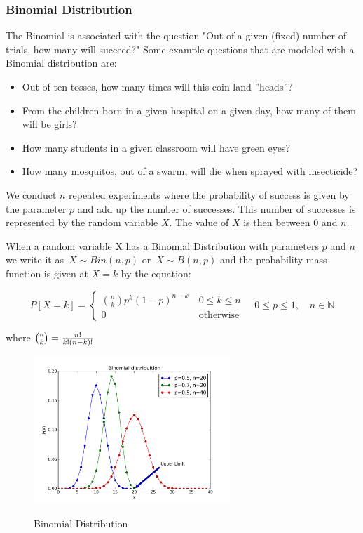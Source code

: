 \subsubsection{Binomial Distribution}
The Binomial is associated with the question "Out of a given (fixed) number of trials, how many will succeed?" Some example questions that are modeled with a Binomial distribution are:
\begin{itemize}
  \item Out of ten tosses, how many times will this coin land ''heads''?
  \item From the children born in a given hospital on a given day, how many of them will be girls?
  \item How many students in a given classroom will have green eyes?
  \item How many mosquitos, out of a swarm, will die when sprayed with insecticide?
\end{itemize}

  We conduct $n$ repeated experiments where the probability of success is given by the parameter $p$ and add up the number of successes. This number of successes is represented by the random variable $X$.  The value of $X$ is then between 0 and $n$.

When a random variable X has a Binomial Distribution with parameters $p$ and $n$ we write it as $\,X \sim Bin(n,p)$ or $\,X \sim B(n,p)$ and the probability mass function is given at $X=k$ by the equation:

\begin{equation}
    P\left[X = k\right] = \begin{cases} {n \choose k} p^k \left(1-p\right)^{n-k}\ & 0 \le k \le n \\ 0 & \mbox{otherwise} \end{cases} \quad 0 \leq p \leq 1, \quad n \in \mathbb{N}
\end{equation}

where ${n \choose k}={n! \over k!(n-k)!}$

\begin{figure}
  \centering
  \includegraphics[width=0.66\textwidth]{../Images/Binomial_distribution_pmf.png}\\
  \caption{Binomial Distribution}
\end{figure}

